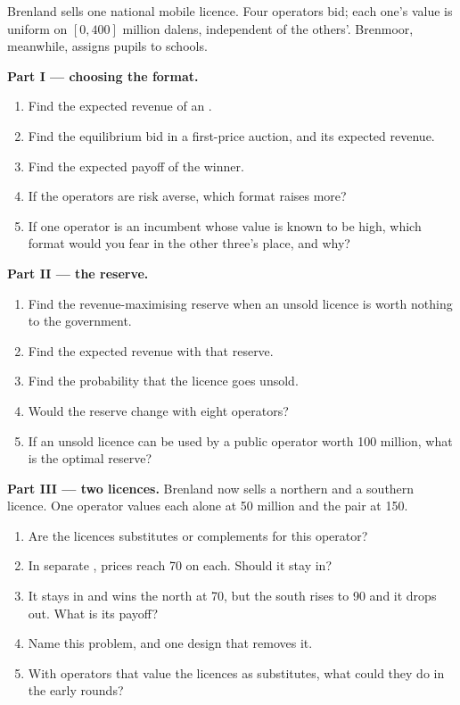 \begin{problem}\label{pb:b3:auctions-and-market-design:spectrum}
Brenland sells one national mobile licence. Four operators bid; each one's value is
uniform on $[0, 400]$ million dalens, independent of the others'. Brenmoor, meanwhile, assigns
pupils to schools. %

\medskip\noindent\textbf{Part I --- choosing the format.}
\begin{enumerate}
\item Find the expected revenue of an .
\item Find the equilibrium bid in a first-price auction, and its expected revenue.
\item Find the expected payoff of the winner.
\item If the operators are risk averse, which format raises more?
\item If one operator is an incumbent whose value is known to be high, which format
would you fear in the other three's place, and why?
\end{enumerate}

\medskip\noindent\textbf{Part II --- the reserve.}
\begin{enumerate}[resume]
\item Find the revenue-maximising reserve when an unsold licence is worth nothing to
the government.
\item Find the expected revenue with that reserve.
\item Find the probability that the licence goes unsold.
\item Would the reserve change with eight operators?
\item If an unsold licence can be used by a public operator worth 100 million, what is the
optimal reserve?
\end{enumerate}

\medskip\noindent\textbf{Part III --- two licences.} Brenland now sells a northern and a
southern licence. One operator values each alone at 50 million and the pair at 150.
\begin{enumerate}[resume]
\item Are the licences substitutes or complements for this operator?
\item In separate , prices reach 70 on each. Should it stay
in?
\item It stays in and wins the north at 70, but the south rises to 90 and it drops out. What is
its payoff?
\item Name this problem, and one design that removes it.
\item With operators that value the licences as substitutes, what could they do in the
early rounds?
\end{enumerate}


\end{problem}
